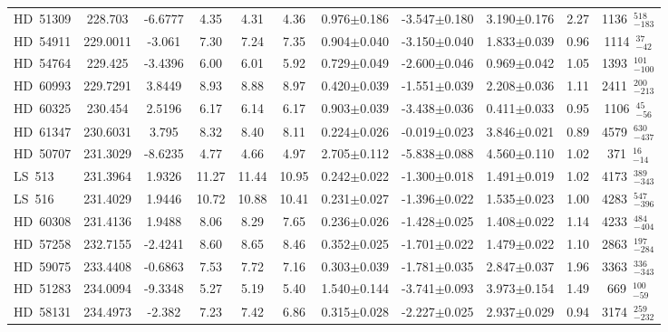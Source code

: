{\begin{longtable}{lcccccccccc}
HD~51309 & 228.703 & -6.6777 & 4.35 & 4.31 & 4.36 & 0.976$\pm$0.186 & -3.547$\pm$0.180 & 3.190$\pm$0.176 & 2.27 & 1136~$_{-183}^{518}$ \\
\noalign{\smallskip}
HD~54911 & 229.0011 & -3.061 & 7.30 & 7.24 & 7.35 & 0.904$\pm$0.040 & -3.150$\pm$0.040 & 1.833$\pm$0.039 & 0.96 & 1114~$_{-42}^{37}$ \\
\noalign{\smallskip}
HD~54764 & 229.425 & -3.4396 & 6.00 & 6.01 & 5.92 & 0.729$\pm$0.049 & -2.600$\pm$0.046 & 0.969$\pm$0.042 & 1.05 & 1393~$_{-100}^{101}$ \\
\noalign{\smallskip}
HD~60993 & 229.7291 & 3.8449 & 8.93 & 8.88 & 8.97 & 0.420$\pm$0.039 & -1.551$\pm$0.039 & 2.208$\pm$0.036 & 1.11 & 2411~$_{-213}^{200}$ \\
\noalign{\smallskip}
HD~60325 & 230.454 & 2.5196 & 6.17 & 6.14 & 6.17 & 0.903$\pm$0.039 & -3.438$\pm$0.036 & 0.411$\pm$0.033 & 0.95 & 1106~$_{-56}^{45}$ \\
\noalign{\smallskip}
HD~61347 & 230.6031 & 3.795 & 8.32 & 8.40 & 8.11 & 0.224$\pm$0.026 & -0.019$\pm$0.023 & 3.846$\pm$0.021 & 0.89 & 4579~$_{-437}^{630}$ \\
\noalign{\smallskip}
HD~50707 & 231.3029 & -8.6235 & 4.77 & 4.66 & 4.97 & 2.705$\pm$0.112 & -5.838$\pm$0.088 & 4.560$\pm$0.110 & 1.02 & 371~$_{-14}^{16}$ \\
\noalign{\smallskip}
LS~513 & 231.3964 & 1.9326 & 11.27 & 11.44 & 10.95 & 0.242$\pm$0.022 & -1.300$\pm$0.018 & 1.491$\pm$0.019 & 1.02 & 4173~$_{-343}^{389}$ \\
\noalign{\smallskip}
LS~516 & 231.4029 & 1.9446 & 10.72 & 10.88 & 10.41 & 0.231$\pm$0.027 & -1.396$\pm$0.022 & 1.535$\pm$0.023 & 1.00 & 4283~$_{-396}^{547}$ \\
\noalign{\smallskip}
HD~60308 & 231.4136 & 1.9488 & 8.06 & 8.29 & 7.65 & 0.236$\pm$0.026 & -1.428$\pm$0.025 & 1.408$\pm$0.022 & 1.14 & 4233~$_{-404}^{484}$ \\
\noalign{\smallskip}
HD~57258 & 232.7155 & -2.4241 & 8.60 & 8.65 & 8.46 & 0.352$\pm$0.025 & -1.701$\pm$0.022 & 1.479$\pm$0.022 & 1.10 & 2863~$_{-284}^{197}$ \\
\noalign{\smallskip}
HD~59075 & 233.4408 & -0.6863 & 7.53 & 7.72 & 7.16 & 0.303$\pm$0.039 & -1.781$\pm$0.035 & 2.847$\pm$0.037 & 1.96 & 3363~$_{-343}^{336}$ \\
\noalign{\smallskip}
HD~51283 & 234.0094 & -9.3348 & 5.27 & 5.19 & 5.40 & 1.540$\pm$0.144 & -3.741$\pm$0.093 & 3.973$\pm$0.154 & 1.49 & 669~$_{-59}^{100}$ \\
\noalign{\smallskip}
HD~58131 & 234.4973 & -2.382 & 7.23 & 7.42 & 6.86 & 0.315$\pm$0.028 & -2.227$\pm$0.025 & 2.937$\pm$0.029 & 0.94 & 3174~$_{-232}^{259}$ \\

\end{longtable}}
